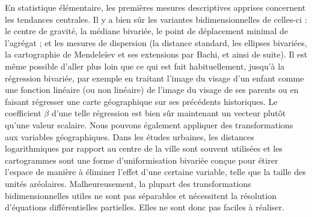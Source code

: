 \documentclass[a4paper,11pt]{article}
\begin{document}
En statistique élémentaire, les premières mesures descriptives apprises concernent les tendances centrales. Il y a bien sûr les variantes bidimensionnelles de celles-ci : le centre de gravité, la médiane bivariée, le point de déplacement minimal de l'agrégat ; et les mesures de dispersion (la distance standard, les ellipses bivariées, la cartographie de Mendeleïev et ses extensions par Bachi, et ainsi de suite). Il est même possible d'aller plus loin que ce qui est fait habituellement, jusqu'à la régression bivariée, par exemple  en traitant l'image du visage d'un enfant comme une fonction linéaire (ou non linéaire) de l'image du visage de ses parents ou en faisant régresser une carte géographique sur ses précédents historiques. Le coefficient $\beta$ d'une telle régression est bien sûr maintenant un vecteur plutôt qu'une valeur scalaire. Nous pouvons également appliquer des transformations aux variables géographiques. Dans les études urbaines, les distances logarithmiques par rapport au centre de la ville sont souvent utilisées et les cartogrammes sont une forme d'uniformisation bivariée conçue pour étirer l'espace de manière à éliminer l'effet d'une certaine variable, telle que la taille des unités aréolaires. Malheureusement, la plupart des transformations bidimensionnelles utiles ne sont pas séparables et nécessitent la résolution d'équations différentielles partielles. Elles ne sont donc pas faciles à réaliser.

\smallskip
\end{document}
